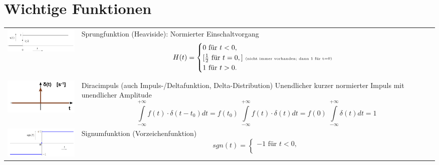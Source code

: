 
\section{Wichtige Funktionen}
\begin{tabular}{p{5cm} p{12.5cm}}
  \includegraphics[width = 5cm, valign=t]{include/Wichtige Funktionen/img/Sprungfunktion.png} &
  Sprungfunktion (Heaviside):
  Normierter Einschaltvorgang
  $$H(t) = \begin{cases}
               0 \textrm{ für }  t<0,                                                                      \\
               [\frac{1}{2} \textrm{ für }  t = 0,] \textrm{ \tiny(nicht immer vorhanden; dann 1 für t=0)} \\
               1 \textrm{ für }  t >0.
             \end{cases}   $$
  \\
  \includegraphics[width = 5cm, valign=t]{include/Wichtige Funktionen/img/Impulsfunktion.png} &
  Diracimpuls \tiny (auch Impuls-/Deltafunktion, Delta-Distribution)
  \normalsize \newline
  Unendlicher kurzer normierter Impuls mit unendlicher Amplitude
  $$\int\limits _{-\infty} ^{+\infty} f(t) \cdot \delta (t-t_0) dt = f(t_0) \;
    \int\limits _{-\infty} ^{+\infty} f(t) \cdot \delta (t) dt = f(0) \;
  \int\limits _{-\infty} ^{+\infty} \delta (t) dt = 1$$                                 \\
  \includegraphics[width = 5cm, valign=t]{include/Wichtige Funktionen/img/Signumfunktion.png} &
  Signumfunktion (Vorzeichenfunktion)
  $$sgn(t) = \begin{cases}
                 -1 \textrm{ für }  t<0,  \\

\end{cases}$$
\end{tabular}
